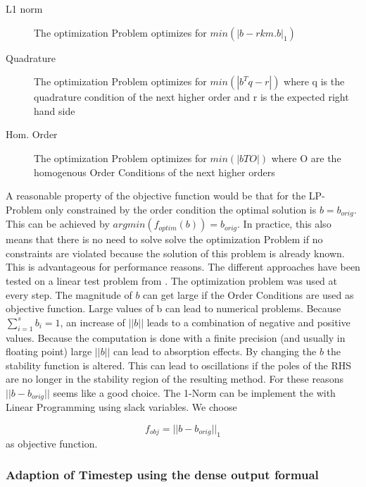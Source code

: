 \documentclass{article}
\begin{document}
\begin{description}

\item[L1 norm] The optimization Problem optimizes for $min(|b-rkm.b|_1)$
            
\item[Quadrature]   The optimization Problem optimizes for $min(|b^Tq-r|)$
                            where q is the quadrature condition of the next higher order 
                            and r is the expected right hand side
            
\item[Hom. Order]    The optimization Problem optimizes for $min(|bTO|)$ where O are the homogenous Order Conditions of the next higher orders
                            
 
\end{description}

A reasonable property of the objective function would be that for the LP-Problem only constrained by the order condition the optimal solution is $b = b_{orig}$. 
This can be achieved by $argmin(f_{optim}(b)) = b_{orig}$. 
In practice, this also means that there is no need to solve solve the optimization Problem if no constraints are violated because the solution of this problem is already known. This is advantageous for performance reasons.
The different approaches have been tested on a linear test problem from \cite{kopecz_unconditionally_2018}. The optimization problem was used at every step.
The magnitude of $b$ can get large if the Order Conditions are used as objective function.
Large values of b can lead to numerical problems. Because $\sum_{i  = 1}^s b_i = 1$, an increase of $||b||$ leads to a combination of negative and positive values. Because the computation is done with a finite precision (and usually in floating point) large $||b||$ can lead to absorption effects.    
By changing the $b$ the stability function is altered. This can lead to oscillations if the poles of the RHS are no longer in the stability region of the resulting method.
For these reasons $||b-b_{orig}||$ seems like a good choice. The 1-Norm can be implement the with Linear Programming using slack variables. We choose 

\begin{equation}
f_{obj} = ||b-b_{orig}||_1
\end{equation}
 as objective function.



\subsubsection{Adaption of Timestep using the dense output formual}
\end{document}
